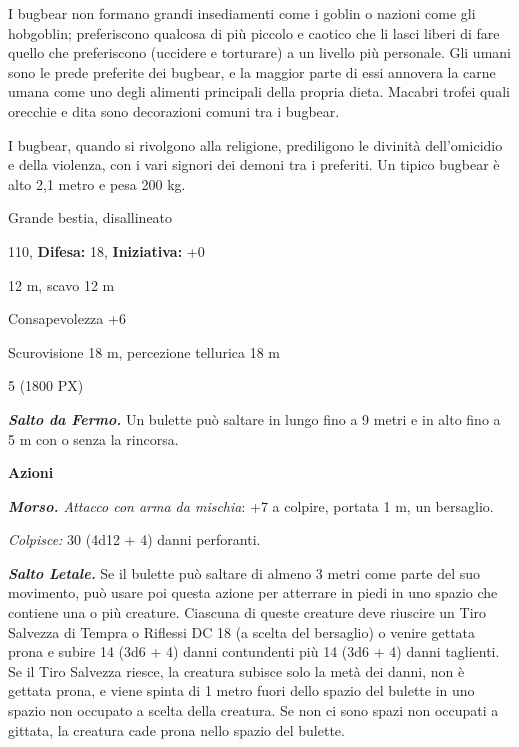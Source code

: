 \begin{multicols}{2}
{I bugbear non formano grandi insediamenti come i goblin o nazioni come gli hobgoblin; preferiscono qualcosa di più piccolo e caotico che li lasci liberi di fare quello che preferiscono (uccidere e torturare) a un livello più personale. Gli umani sono le prede preferite dei bugbear, e la maggior parte di essi annovera la carne umana come uno degli alimenti principali della propria dieta. Macabri trofei quali orecchie e dita sono decorazioni comuni tra i bugbear.

I bugbear, quando si rivolgono alla religione, prediligono le divinità dell'omicidio e della violenza, con i vari signori dei demoni tra i preferiti. Un tipico bugbear è alto 2,1 metro e pesa 200 kg.

\noindent
\begin{description}[noitemsep, topsep=0pt, parsep=0pt, partopsep=0pt, leftmargin=0cm, labelwidth=2.2cm]
	\item[\textbf{Taglia/Tipo:}] Grande bestia, disallineato
	\item[\textbf{Caratt.:}] 
	\item[\textbf{Punti Ferita:}] 110,  \textbf{Difesa:} 18,  \textbf{Iniziativa:} +0
	\item[\textbf{Movimento:}] 12 m, scavo 12 m
	\item[\textbf{Tiri Salvez.:}] 
	\item[\textbf{Comp.:}] Consapevolezza +6
	\item[\textbf{Sensi:}] Scurovisione 18 m, percezione tellurica 18 m
	\item[\textbf{Sfida:}] 5 (1800 PX)\smallskip
\end{description}

\emph{\textbf{Salto da Fermo.}} Un bulette può saltare in lungo fino a 9 metri e in alto fino a 5 m con o senza la rincorsa.

\textbf{Azioni}

\emph{\textbf{Morso.} Attacco con arma da mischia}: +7 a colpire, portata 1 m, un bersaglio.

\emph{Colpisce:} 30 (4d12 + 4) danni perforanti.

\emph{\textbf{Salto Letale.}} Se il bulette può saltare di almeno 3 metri come parte del suo movimento, può usare poi questa azione per atterrare in piedi in uno spazio che contiene una o più creature. Ciascuna di queste creature deve riuscire un Tiro Salvezza di Tempra o Riflessi DC 18 (a scelta del bersaglio) o venire gettata prona e subire 14 (3d6 + 4) danni contundenti più 14 (3d6 + 4) danni taglienti. Se il Tiro Salvezza riesce, la creatura subisce solo la metà dei danni, non è gettata prona, e viene spinta di 1 metro fuori dello spazio del bulette in uno spazio non occupato a scelta della creatura. Se non ci sono spazi non occupati a gittata, la creatura cade prona nello spazio del bulette.

}
\end{multicols}
